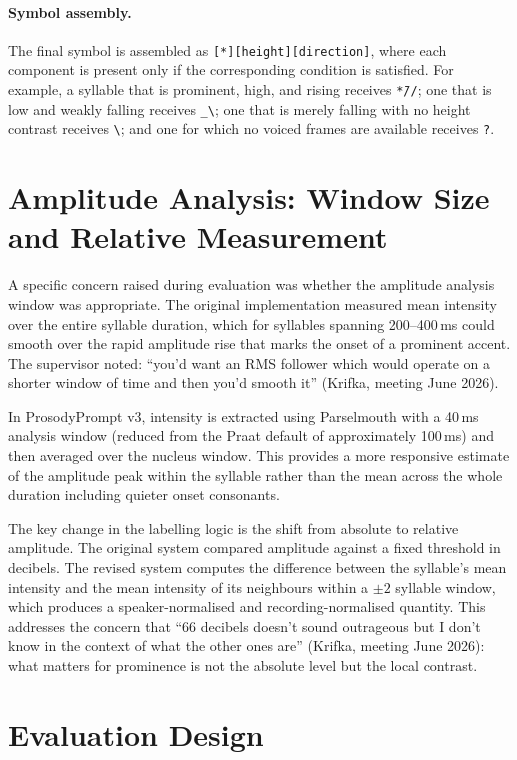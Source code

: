 \paragraph{Symbol assembly.}
The final symbol is assembled as \texttt{[*][height][direction]}, where each
component is present only if the corresponding condition is satisfied. For
example, a syllable that is prominent, high, and rising receives
\texttt{*{\={}}//}; one that is low and weakly falling receives
\texttt{\_\textbackslash}; one that is merely falling with no height contrast
receives \texttt{\textbackslash}; and one for which no voiced frames are
available receives \texttt{?}.

\section{Amplitude Analysis: Window Size and Relative Measurement}
\label{sec:amplitude}

A specific concern raised during evaluation was whether the amplitude analysis
window was appropriate. The original implementation measured mean intensity over
the entire syllable duration, which for syllables spanning 200--400\,ms could
smooth over the rapid amplitude rise that marks the onset of a prominent accent.
The supervisor noted: ``you'd want an RMS follower which would operate on a
shorter window of time and then you'd smooth it'' (Krifka, meeting June 2026).

In ProsodyPrompt v3, intensity is extracted using Parselmouth with a 40\,ms
analysis window (reduced from the Praat default of approximately 100\,ms) and
then averaged over the nucleus window. This provides a more responsive estimate
of the amplitude peak within the syllable rather than the mean across the whole
duration including quieter onset consonants.

The key change in the labelling logic is the shift from absolute to relative
amplitude. The original system compared amplitude against a fixed threshold in
decibels. The revised system computes the difference between the syllable's mean
intensity and the mean intensity of its neighbours within a $\pm 2$ syllable
window, which produces a speaker-normalised and recording-normalised quantity.
This addresses the concern that ``66 decibels doesn't sound outrageous but I
don't know in the context of what the other ones are'' (Krifka, meeting June 2026):
what matters for prominence is not the absolute level but the local contrast.

\section{Evaluation Design}
\label{sec:eval_design}

